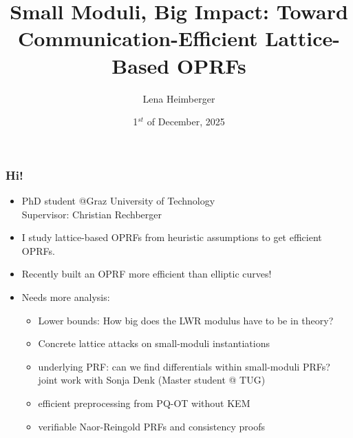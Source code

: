 \documentclass[10pt]{beamer}
\title{ Small Moduli, Big Impact: Toward Communication-Efficient Lattice-Based OPRFs}
\date{1$^{st}$ of December, 2025}
\author{Lena Heimberger}
\institute{Monash University}
\begin{document}
\maketitle



\begin{frame}
  \frametitle{Hi!}
  \begin{itemize}
    \item PhD student @Graz University of Technology \\ Supervisor:
      Christian Rechberger\pause
    \item I study lattice-based OPRFs from heuristic assumptions to get
      \alert{efficient} OPRFs. \pause
    \item Recently built an OPRF more efficient than elliptic
      curves!~\cite{EC:HKLMRR25}\pause
    \item Needs more analysis: 
      \begin{itemize}
        \item Lower bounds: How big does the LWR modulus have to be in theory? \pause
        \item Concrete lattice attacks on small-moduli instantiations \pause
        \item underlying PRF: can we find differentials within small-moduli
          PRFs? \\ joint work with
      Sonja Denk (Master student @ TUG)\pause
    \item efficient preprocessing from PQ-OT without KEM\pause
    \item verifiable Naor-Reingold PRFs and consistency proofs 
  \end{itemize}

  \end{itemize}
\end{frame}
\end{document}
